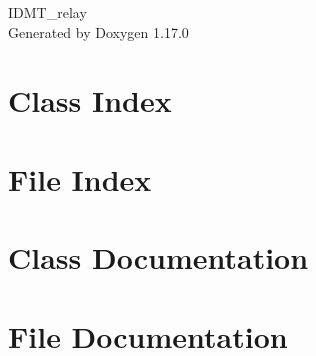\documentclass[twoside]{book}
\newcommand{\+}{\discretionary{\mbox{\scriptsize$\hookleftarrow$}}{}{}}
\newcommand{\clearemptydoublepage}{%
    \newpage{\pagestyle{empty}\cleardoublepage}%
  }
\begin{document}
  \raggedbottom
  \begin{titlepage}
  \vspace*{7cm}
  \begin{center}%
  {\Large IDMT\+\_\+relay}\\
  \vspace*{1cm}
  {\large Generated by Doxygen 1.17.0}\\
  \end{center}
  \end{titlepage}
  \clearemptydoublepage
  \tableofcontents
  \clearemptydoublepage
\chapter{Class Index}

\chapter{File Index}

\chapter{Class Documentation}





\chapter{File Documentation}






  \backmatter
  \newpage
  \clearemptydoublepage
  \printindex
\end{document}
